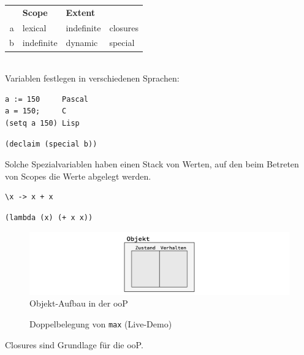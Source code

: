 		\begin{tabular}{rlll}
			& \textbf{Scope}	& \textbf{Extent} &  \\
		a	& lexical		& indefinite	& closures \\
		b	& indefinite	& dynamic		& special \\
		\end{tabular}$\;$\\

		Variablen festlegen in verschiedenen Sprachen:
		\begin{verbatim}
a := 150     Pascal
a = 150;     C
(setq a 150) Lisp
		\end{verbatim}

		\lstLisp[Spezialvariablen]
		\begin{lstlisting}
(declaim (special b))
		\end{lstlisting}

		Solche Spezialvariablen haben einen Stack von Werten, auf den beim Betreten von Scopes die Werte abgelegt werden.

	\begin{lstlisting}
\x -> x + x
		\end{lstlisting}

		\begin{lstlisting}
(lambda (x) (+ x x))
		\end{lstlisting}

		\begin{figure}[H]
			\caption{Objekt-Aufbau in der ooP}
			\includegraphics[width=\textwidth]{workfiles/v11_2}
		\end{figure}

		\begin{figure}[H]
			\centering
			\caption{Doppelbelegung von \texttt{max} (Live-Demo)}
		\end{figure}

		Closures sind Grundlage für die ooP.

